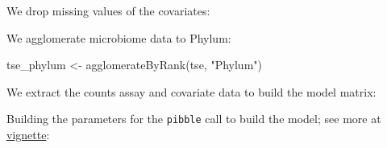 \documentclass[
]{book}
\newenvironment{Shaded}{\begin{snugshade}}{\end{snugshade}}
\newcommand{\AttributeTok}[1]{\textcolor[rgb]{0.77,0.63,0.00}{#1}}
\newcommand{\CommentTok}[1]{\textcolor[rgb]{0.56,0.35,0.01}{\textit{#1}}}
\newcommand{\FunctionTok}[1]{\textcolor[rgb]{0.00,0.00,0.00}{#1}}
\newcommand{\NormalTok}[1]{#1}
\newcommand{\OtherTok}[1]{\textcolor[rgb]{0.56,0.35,0.01}{#1}}
\newcommand{\SpecialCharTok}[1]{\textcolor[rgb]{0.00,0.00,0.00}{#1}}
\newcommand{\StringTok}[1]{\textcolor[rgb]{0.31,0.60,0.02}{#1}}
\begin{document}
We drop missing values of the covariates:

\begin{Shaded}
\end{Shaded}

We agglomerate microbiome data to Phylum:

\begin{Shaded}
\begin{Highlighting}[]
\NormalTok{tse\_phylum }\OtherTok{\textless{}{-}} \FunctionTok{agglomerateByRank}\NormalTok{(tse, }\StringTok{"Phylum"}\NormalTok{)}
\end{Highlighting}
\end{Shaded}

We extract the counts assay and covariate data to build the model
matrix:

\begin{Shaded}
\end{Shaded}

Building the parameters for the \texttt{pibble} call to build the model; see more at \href{https://jsilve24.github.io/fido/articles/introduction-to-fido.html}{vignette}:
\end{document}
